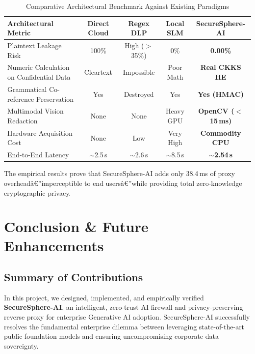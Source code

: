 \documentclass[12pt,a4paper,oneside]{report}
\numberwithin{equation}{chapter}
\begin{document}
\begin{table}[htbp]
\centering
\caption{Comparative Architectural Benchmark Against Existing Paradigms}\label{tab:comparison}
\begin{tabular}{p{}cccc}
\toprule
\textbf{Architectural Metric} & \textbf{Direct Cloud} & \textbf{Regex DLP} & \textbf{Local SLM} & \textbf{SecureSphere-AI} \\
\midrule
Plaintext Leakage Risk & 100\% & High ($>$35\%) & 0\% & \textbf{0.00\%} \\
Numeric Calculation on Confidential Data & Cleartext & Impossible & Poor Math & \textbf{Real CKKS HE} \\
Grammatical Co-reference Preservation & Yes & Destroyed & Yes & \textbf{Yes (HMAC)} \\
Multimodal Vision Redaction & None & None & Heavy GPU & \textbf{OpenCV ($<$15\,ms)} \\
Hardware Acquisition Cost & None & Low & Very High & \textbf{Commodity CPU} \\
End-to-End Latency & $\sim$2.5\,s & $\sim$2.6\,s & $\sim$8.5\,s & \textbf{$\sim$2.54\,s} \\
\bottomrule
\end{tabular}
\end{table}
The empirical results prove that SecureSphere-AI adds only 38.4\,ms of proxy overheadâ€”imperceptible to end usersâ€”while providing total zero-knowledge cryptographic privacy.

\chapter{Conclusion \& Future Enhancements}

\section{Summary of Contributions}
In this project, we designed, implemented, and empirically verified \textbf{SecureSphere-AI}, an intelligent, zero-trust AI firewall and privacy-preserving reverse proxy for enterprise Generative AI adoption. SecureSphere-AI successfully resolves the fundamental enterprise dilemma between leveraging state-of-the-art public foundation models and ensuring uncompromising corporate data sovereignty.
\end{document}
